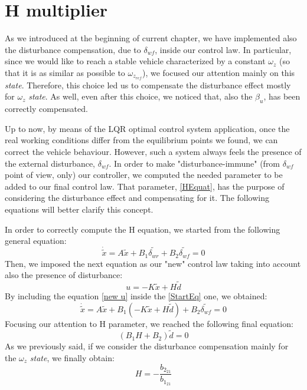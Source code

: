\section{H multiplier} \label{H section}
As we introduced at the beginning of current chapter, we have implemented also the disturbance compensation, due to $\delta_{wf}$, inside our control law. In particular, since we would like to reach a stable vehicle characterized by a constant $\omega_{z}$ (so that it is as similar as possible to $\omega_{z_{ref}}$), we focused our attention mainly on this \textit{state}. Therefore, this choice led us to compensate the disturbance effect mostly for $\omega_{z}$ \textit{state}. As well, even after this choice, we noticed that, also the $\beta_{u}$, has been correctly compensated. 

Up to now, by means of the LQR optimal control system application, once the real working conditions differ from the equilibrium points we found, we can correct the vehicle behaviour. However, such a system always feels the presence of the external disturbance, $\delta_{wf}$. In order to make "disturbance-immune" (from $\delta_{wf}$ point of view, only) our controller, we computed the needed parameter to be added to our final control law. That parameter, \ref{HEquat}, has the purpose of considering the disturbance effect and compensating for it.
The following equations will better clarify this concept.

In order to correctly compute the H equation, we started from the following general equation:
\begin{equation} \label{StartEq}
	\dot{\tilde{x}} = A \tilde{x} + B_{1}\tilde{\delta_{wr}} + B_{2}\tilde{\delta_{wf}} = 0
\end{equation}
Then, we imposed the next equation as our "new" control law taking into account also the presence of disturbance:
\begin{equation} \label{new u}
	u = - K \tilde{x} + H \tilde{d}
\end{equation}
By including the equation \ref{new u} inside the \ref{StartEq} one, we obtained:
\begin{equation}
	\dot{\tilde{x}} = A \tilde{x} + B_{1}(- K \tilde{x} + H \tilde{d}) + B_{2}\tilde{\delta_{wf}} = 0
\end{equation}
Focusing our attention to H parameter, we reached the following final equation:
\begin{equation}
 (B_{1} H + B_{2})\tilde{d} = 0
\end{equation}
As we previously said, if we consider the disturbance compensation mainly for the $\omega_{z}$ \textit{state}, we finally obtain:
\begin{equation} 
\label{HEquat}
H = -\frac{b_{{2}_{21}}}{b_{{1}_{21}}}
\end{equation}
